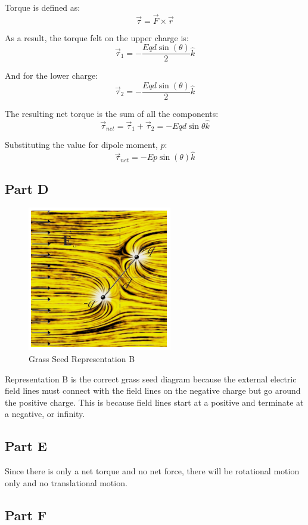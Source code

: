\documentclass{article}
\begin{document}
Torque is defined as:
$$ \vec{\tau} = \vec{F} \times \vec{r} $$

As a result, the torque felt on the upper charge is:
$$ \vec{\tau}_{1} = -\frac{ Eqd \sin(\theta) }{ 2 } \hat{k} $$

And for the lower charge:
$$ \vec{\tau}_{2} = -\frac{ Eqd \sin(\theta) }{ 2 } \hat{k} $$

The resulting net torque is the sum of all the components:
$$ \vec{\tau}_{net} = \vec{\tau}_{1} + \vec{\tau}_{2} = -Eqd \sin{\theta}
\hat{k} $$

Substituting the value for dipole moment, $p$:
$$ \vec{\tau}_{net} = -Ep \sin(\theta) \hat{k} $$

\subsection*{Part D}

\begin{figure}[H]
  \centering
  \includegraphics[scale=0.75]{"GrassSeedRepresentationB"}
  \caption{Grass Seed Representation B}
\end{figure}

Representation B is the correct grass seed diagram because the external electric
field lines must connect with the field lines on the negative charge but go
around the positive charge. This is because field lines start at a positive and
terminate at a negative, or infinity.

\subsection*{Part E}

Since there is only a net torque and no net force, there will be rotational
motion only and no translational motion.

\subsection*{Part F}
\end{document}
